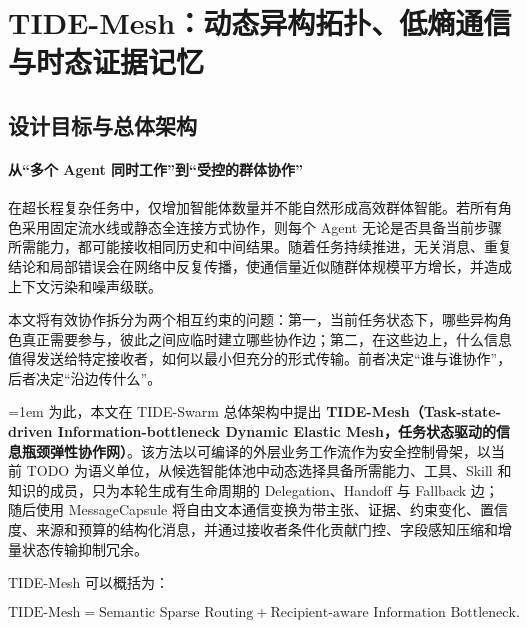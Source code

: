 

\section{TIDE-Mesh：动态异构拓扑、低熵通信与时态证据记忆}
\label{sec:tide_mesh}

\subsection{设计目标与总体架构}

\paragraph{从``多个 Agent 同时工作''到``受控的群体协作''}

在超长程复杂任务中，仅增加智能体数量并不能自然形成高效群体智能。若所有角色采用固定流水线或静态全连接方式协作，则每个 Agent 无论是否具备当前步骤所需能力，都可能接收相同历史和中间结果。随着任务持续推进，无关消息、重复结论和局部错误会在网络中反复传播，使通信量近似随群体规模平方增长，并造成上下文污染和噪声级联。

本文将有效协作拆分为两个相互约束的问题：第一，当前任务状态下，哪些异构角色真正需要参与，彼此之间应临时建立哪些协作边；第二，在这些边上，什么信息值得发送给特定接收者，如何以最小但充分的形式传输。前者决定``谁与谁协作''，后者决定``沿边传什么''。

{\emergencystretch=1em 为此，本文在 TIDE-Swarm 总体架构中提出 \textbf{TIDE-Mesh（Task-state-driven\allowbreak{} Information-bottleneck\allowbreak{} Dynamic Elastic Mesh，任务状态驱动的信息瓶颈弹性协作网）}。该方法以可编译的外层业务工作流作为安全控制骨架，以当前 TODO 为语义单位，从候选智能体池中动态选择具备所需能力、工具、Skill 和知识的成员，只为本轮生成有生命周期的 Delegation、Handoff 与 Fallback 边；随后使用 MessageCapsule 将自由文本通信变换为带主张、证据、约束变化、置信度、来源和预算的结构化消息，并通过接收者条件化贡献门控、字段感知压缩和增量状态传输抑制冗余。\par}

TIDE-Mesh 可以概括为：

\[
\text{TIDE-Mesh}=\text{Semantic Sparse Routing}+\text{Recipient-aware Information Bottleneck}.
\]

